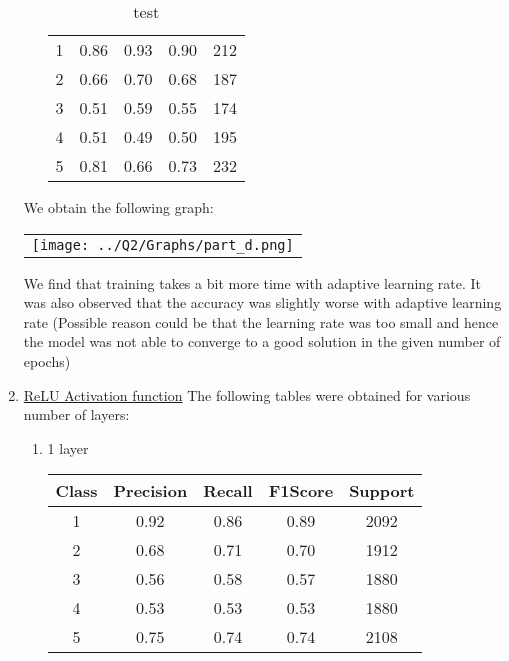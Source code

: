 \begin{enumerate}[label=(\alph*)]
\begin{enumerate}[label=\roman*.]
\begin{table}[!htb]
\begin{tabular}{ccccc}
            1     & 0.86      & 0.93   & 0.90    & 212     \\
            2     & 0.66      & 0.70   & 0.68    & 187     \\
            3     & 0.51      & 0.59   & 0.55    & 174     \\
            4     & 0.51      & 0.49   & 0.50    & 195     \\
            5     & 0.81      & 0.66   & 0.73    & 232     \\ \hline
            \end{tabular}
            \caption{test}
            \label{part d test depth 4}
        \end{table}
        \newpage
        

    \end{enumerate}
    We obtain the following graph:
    \begin{center}
        \begin{tabular}{c}
            \texttt{[image: ../Q2/Graphs/part\_d.png]}
        \end{tabular}
    \end{center}
    We find that training takes a bit more time with adaptive learning rate. It was also observed that the accuracy was slightly worse with adaptive learning rate (Possible reason could be that the learning rate was too small and hence the model was not able to converge to a good solution in the given number of epochs)
    \item \underline{ReLU Activation function} The following tables were obtained for various number of layers:
    \begin{enumerate}[label=\roman*.]
        \item 1 layer
        \begin{table}[!htb]
            \centering
            \begin{tabular}{ccccc}
            \hline
            Class & Precision & Recall & F1Score & Support \\ \hline
            1     & 0.92      & 0.86   & 0.89    & 2092    \\
            2     & 0.68      & 0.71   & 0.70    & 1912    \\
            3     & 0.56      & 0.58   & 0.57    & 1880    \\
            4     & 0.53      & 0.53   & 0.53    & 1880    \\
            5     & 0.75      & 0.74   & 0.74    & 2108    \\ \hline

\end{tabular}
\end{table}
\end{enumerate}
\end{enumerate}
